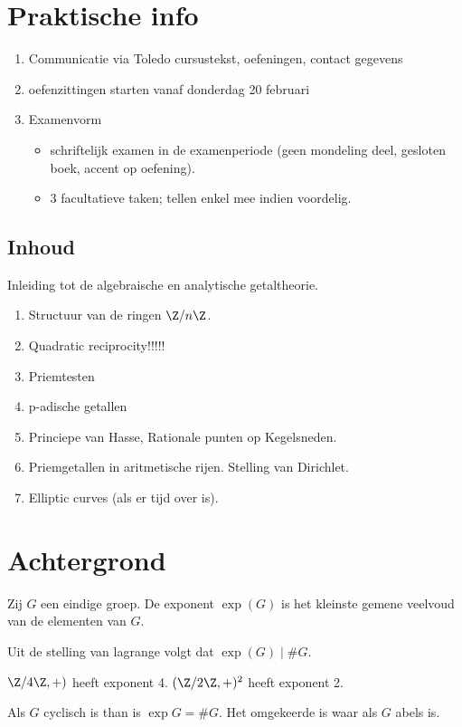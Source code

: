 \setcounter{chapter}{-1}
\chapter{Praktische info}
\begin{enumerate}
	\item Communicatie via Toledo
	\subitem cursustekst, oefeningen, contact gegevens
\item oefenzittingen starten vanaf donderdag 20 februari
\item Examenvorm
	\begin{itemize}
		\item schriftelijk examen in de examenperiode (geen mondeling deel, gesloten boek, accent op oefening).
		\item 3 facultatieve taken; tellen enkel mee indien voordelig.
	\end{itemize}
\end{enumerate}

\section{Inhoud} \label{sec:inhoud}
Inleiding tot de algebraische en analytische getaltheorie.
\begin{enumerate}
	\item Structuur van de ringen $\Z / n \Z$. 
	\item Quadratic reciprocity!!!!!
	\item Priemtesten
	\item p-adische getallen
	\item Princiepe van Hasse, Rationale punten op Kegelsneden.
	\item Priemgetallen in aritmetische rijen.
		Stelling van Dirichlet. 
	\item Elliptic curves (als er tijd over is). 
\end{enumerate}

\chapter{Achtergrond} \label{chap:achtergrond}

\begin{definitie}
	Zij $G$ een eindige groep. De exponent $\exp(G)$ is het kleinste gemene veelvoud van de elementen van $G$. 
\end{definitie}
Uit de stelling van lagrange volgt dat $\exp(G) \;|\; \#G$.
\begin{vb}
	$\Z / 4\Z , + )$ heeft exponent 4. $(\Z / 2 \Z, +) ^2$ heeft exponent 2. 
\end{vb}
Als $G$ cyclisch is than is $\exp G = \#G$. Het omgekeerde is waar als $G$ abels is.

